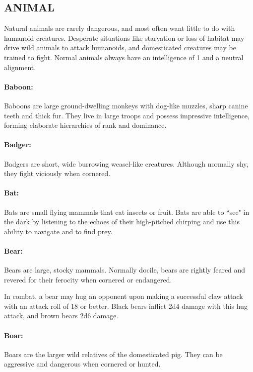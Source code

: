 \begin{multicols}{2}
\subsection{ANIMAL}

Natural animals are rarely dangerous, and most often want little to do with humanoid creatures. Desperate situations like starvation or loss of habitat may drive wild animals to attack humanoids, and domesticated creatures may be trained to fight. Normal animals always have an intelligence of 1 and a neutral alignment.

\paragraph{Baboon:} Baboons are large ground-dwelling monkeys with dog-like muzzles, sharp canine teeth and thick fur. They live in large troops and possess impressive intelligence, forming elaborate hierarchies of rank and dominance.

\paragraph{Badger:} Badgers are short, wide burrowing weasel-like creatures. Although normally shy, they fight viciously when cornered.

\paragraph{Bat:} Bats are small flying mammals that eat insects or fruit. Bats are able to ``see" in the dark by listening to the echoes of their high-pitched chirping and use this ability to navigate and to find prey.

\paragraph{Bear:} Bears are large, stocky mammals. Normally docile, bears are rightly feared and revered for their ferocity when cornered or endangered.

In combat, a bear may hug an opponent upon making a successful claw attack with an attack roll of 18 or better. Black bears inflict 2d4 damage with this hug attack, and brown bears 2d6 damage.

\paragraph{Boar:} Boars are the larger wild relatives of the domesticated pig. They can be aggressive and dangerous when cornered or hunted.


\end{multicols}
